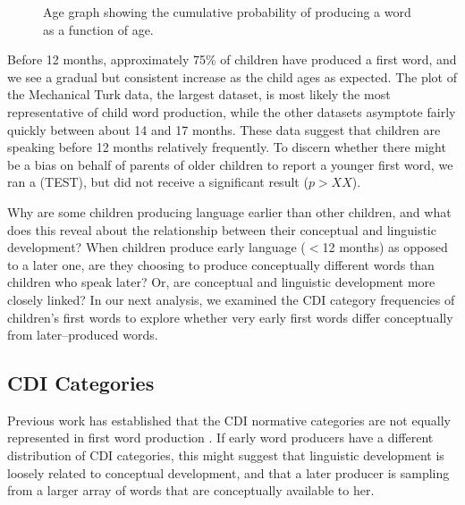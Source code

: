 \documentclass[10pt,letterpaper]{article}
\begin{document}
\begin{figure}[t]
\caption{\label{fig:cdfs} Age graph showing the cumulative probability of producing a word as a function of age.}
\end{figure}

Before 12 months, approximately 75\% of children have produced a first word, and we see a gradual but consistent increase as the child ages as expected. The plot of the Mechanical Turk data, the largest dataset, is most likely the most representative of child word production, while the other datasets asymptote fairly quickly between about 14 and 17 months. 
These data suggest that children are speaking before 12 months relatively frequently. To discern whether there might be a bias on behalf of parents of older children to report a younger first word, we ran a (TEST), but did not receive a significant result ($p > XX$).

Why are some children producing language earlier than other children, and what does this reveal about the relationship between their conceptual and linguistic development? When children produce early language ($<$12 months) as opposed to a later one, are they choosing to produce conceptually different words than children who speak later? Or, are conceptual and linguistic development more closely linked? In our next analysis, we examined the CDI category frequencies of children's first words to explore whether very early first words differ conceptually from later--produced words. 

\subsection{CDI Categories} 
Previous work has established that the CDI normative categories are not equally represented in first word production \cite{fenson1994}. If early word producers have a different distribution of CDI categories, this might suggest that linguistic development is loosely related to conceptual development, and that a later producer is sampling from a larger array of words that are conceptually available to her.
\end{document}
